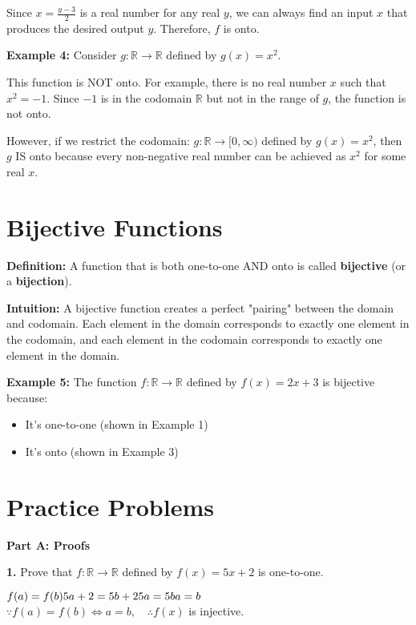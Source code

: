 \documentclass[12pt]{article}
\begin{document}
Since $x = \frac{y - 3}{2}$ is a real number for any real $y$, we can always find an input $x$ that produces the desired output $y$. Therefore, $f$ is onto.

\textbf{Example 4:} Consider $g: \mathbb{R} \to \mathbb{R}$ defined by $g(x) = x^2$.

This function is NOT onto. For example, there is no real number $x$ such that $x^2 = -1$. Since $-1$ is in the codomain $\mathbb{R}$ but not in the range of $g$, the function is not onto.

However, if we restrict the codomain: $g: \mathbb{R} \to [0, \infty)$ defined by $g(x) = x^2$, then $g$ IS onto because every non-negative real number can be achieved as $x^2$ for some real $x$.

\vspace{1cm}

\newpage

\section{Bijective Functions}

\textbf{Definition:} A function that is both one-to-one AND onto is called \textbf{bijective} (or a \textbf{bijection}).

\vspace{0.7cm}

\textbf{Intuition:} A bijective function creates a perfect "pairing" between the domain and codomain. Each element in the domain corresponds to exactly one element in the codomain, and each element in the codomain corresponds to exactly one element in the domain.

\vspace{0.7cm}

\textbf{Example 5:} The function $f: \mathbb{R} \to \mathbb{R}$ defined by $f(x) = 2x + 3$ is bijective because:
\begin{itemize}
\item It's one-to-one (shown in Example 1)
\item It's onto (shown in Example 3)
\end{itemize}

\section{Practice Problems}

\textbf{Part A: Proofs}

\textbf{1.} Prove that $f: \mathbb{R} \to \mathbb{R}$ defined by $f(x) = 5x + 2$ is one-to-one.
\begin{adjustwidth}{1.5cm}{}
\begin{minipage}[t][4cm][t]{\linewidth}
    $\displaystyle f(a) = f(b)
    \\[8pt] 5a+2 = 5b+2
    \\[8pt] 5a = 5b
    \\[8pt] a = b$
    \\[8pt] $\because f(a) = f(b) \iff a = b, \quad \therefore f(x)$ is injective.
\end{minipage}
\end{adjustwidth}
\end{document}
